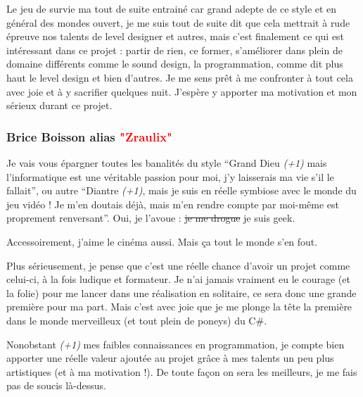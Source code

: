 \documentclass{article}
\begin{document}
\par 
Le jeu de survie ma tout de suite entrainé car grand adepte de ce style et en général des mondes ouvert, je me suis tout de suite dit que cela mettrait à rude épreuve nos talents de level designer et autres, mais c'est finalement ce qui est intéressant dans ce projet : partir de rien, ce former, s'améliorer dans plein de domaine différents comme le sound design, la programmation, comme dit plus haut le level design et bien d'autres. Je me sens prêt à me confronter à tout cela avec joie et à y sacrifier quelques nuit.
J'espère y apporter ma motivation et mon sérieux durant ce projet.
\newline





\subsubsection{Brice Boisson alias \textcolor{red}{"Zraulix"}}

\par
Je vais vous épargner toutes les banalités du style “Grand Dieu \emph{(+1)} mais l’informatique est une véritable passion pour moi, j’y laisserais ma vie s’il le fallait”, ou autre “Diantre \emph{(+1)}, mais je suis en réelle symbiose avec le monde du jeu vidéo ! Je m’en doutais déjà, mais m’en rendre compte par moi-même est proprement renversant”. Oui, je l’avoue : \st{je me drogue}  je suis geek.
\newline

\par
Accessoirement, j’aime le cinéma aussi. Mais ça tout le monde s’en fout.
\newline

\par
Plus sérieusement, je pense que c’est une réelle chance d’avoir un projet comme celui-ci, à la fois ludique et formateur. Je n’ai jamais vraiment eu le courage (et la folie) pour me lancer dans une réalisation en solitaire, ce sera donc une grande première pour ma part. Mais c’est avec joie que je me plonge la tête la première dans le monde merveilleux (et tout plein de poneys) du C\#.
\newline

\par
Nonobstant \emph{(+1)} mes faibles connaissances en programmation, je compte bien apporter une réelle valeur ajoutée au projet grâce à mes talents un peu plus artistiques (et à ma motivation !). De toute façon on sera les meilleurs, je me fais pas de soucis là-dessus.
\newline
\end{document}
